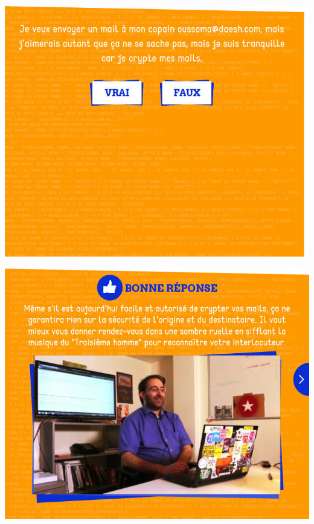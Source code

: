 \documentclass{beamer}
\begin{document}
\begin{frame}\includegraphics[scale=0.6] {./images/Quizz_HygieneNumerique_France4_14.jpg} \end{frame}
\begin{frame}\includegraphics[scale=0.6] {./images/Quizz_HygieneNumerique_France4_15.jpg} \end{frame}
\end{document}
